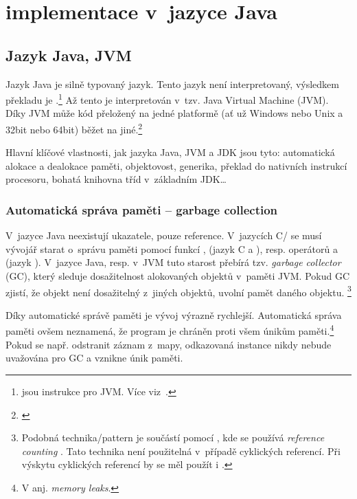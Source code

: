 \chapter{\MIndex{} implementace v~jazyce Java}


\section{Jazyk Java, JVM}

Jazyk Java je silně typovaný jazyk. Tento jazyk není interpretovaný,
výsledkem překladu je \bytecode{}.\footnote{\bytecode{} jsou instrukce pro JVM. Více viz~.} Až tento \bytecode{} je interpretován v~tzv. Java Virtual Machine (JVM).
Díky JVM může kód přeložený na jedné platformě (ať už Windows nebo Unix a 32bit nebo 64bit) běžet na jiné.\footnote{\emph{}\cite{lindholm2013java}}

Hlavní klíčové vlastnosti, jak jazyka Java, JVM a JDK
jsou tyto: automatická alokace a dealokace paměti, objektovost, generika,
překlad \bytecode{} do nativních instrukcí procesoru, bohatá
knihovna tříd v~základním JDK\ldots{}

\subsection{Automatická správa paměti -- garbage collection\label{sec:memorymanagement}}

V~jazyce Java neexistují ukazatele, pouze reference. V~jazycích C/\CC{}
se musí vývojář starat o~správu paměti pomocí funkcí ,
 (jazyk C a \CC), resp. operátorů  a 
(jazyk \CC). V~jazyce Java, resp. v~JVM \cite{lindholm2013java} tuto starost přebírá tzv. \emph{garbage
collector} (GC), který sleduje
dosažitelnost alokovaných objektů v~paměti JVM. Pokud GC
zjistí, že objekt není dosažitelný z~jiných objektů, uvolní pamět daného objektu.
\footnote{Podobná technika/pattern je součástí  pomocí ,
kde se používá \emph{reference counting} \cite{ISO:2012:CPP}. Tato technika není použitelná v~případě cyklických referencí. Při výskytu cyklických referencí by se měl použít i .
}

Díky automatické správě paměti je vývoj výrazně rychlejší.
Automatická správa paměti ovšem neznamená, že program je chráněn proti všem únikům paměti.\footnote{V anj. \emph{memory leaks}.}
Pokud se např.  odstranit záznam z~mapy, odkazovaná instance nikdy nebude uvažována pro GC a vznikne únik paměti.

